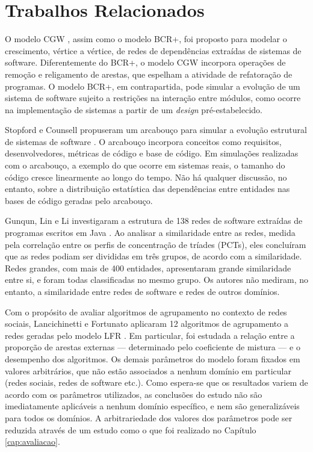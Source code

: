 \chapter{Trabalhos Relacionados} \label{cap:trabrel}

O modelo CGW \cite{Chen2008}, assim como o modelo BCR+, foi proposto para modelar o crescimento, vértice a vértice, de redes de dependências extraídas de sistemas de software. Diferentemente do BCR+, o modelo CGW incorpora operações de remoção e religamento de arestas, que espelham a atividade de refatoração de programas. O modelo BCR+, em contrapartida, pode simular a evolução de um sistema de software sujeito a restrições na interação entre módulos, como ocorre na implementação de sistemas a partir de um \emph{design} pré-estabelecido.

Stopford e Counsell propuseram um arcabouço para simular a evolução estrutural de sistemas de software \cite{Stopford2008}. O arcabouço incorpora conceitos como requisitos, desenvolvedores, métricas de código e base de código. Em simulações realizadas com o arcabouço, a exemplo do que ocorre em sistemas reais, o tamanho do código cresce linearmente ao longo do tempo. Não há qualquer discussão, no entanto, sobre a distribuição estatística das dependências entre entidades nas bases de código geradas pelo arcabouço.

Gunqun, Lin e Li investigaram a estrutura de 138 redes de software extraídas de programas escritos em Java \cite{Gunqun2008}. Ao analisar a similaridade entre as redes, medida pela correlação entre os perfis de concentração de tríades (PCTs), eles concluíram que as redes podiam ser divididas em três grupos, de acordo com a similaridade. Redes grandes, com mais de 400 entidades, apresentaram grande similaridade entre si, e foram todas classificadas no mesmo grupo. Os autores não mediram, no entanto, a similaridade entre redes de software e redes de outros domínios.

Com o propósito de avaliar algoritmos de agrupamento no contexto de redes sociais, Lancichinetti e Fortunato aplicaram 12 algoritmos de agrupamento a redes geradas pelo modelo LFR \cite{Lancichinetti2009b}. Em particular, foi estudada a relação entre a proporção de arestas externas --- determinado pelo coeficiente de mistura --- e o desempenho dos algoritmos. Os demais parâmetros do modelo foram fixados em valores arbitrários, que não estão associados a nenhum domínio em particular (redes sociais, redes de software etc.). Como espera-se que os resultados variem de acordo com os parâmetros utilizados, as conclusões do estudo não são imediatamente aplicáveis a nenhum domínio específico, e nem são generalizáveis para todos os domínios. A arbitrariedade dos valores dos parâmetros pode ser reduzida através de um estudo como o que foi realizado no Capítulo \ref{cap:avaliacao}.

